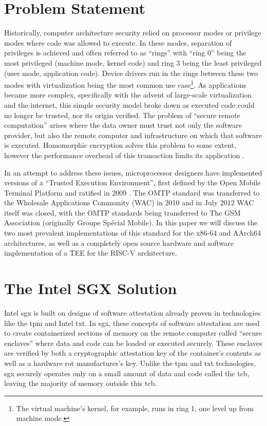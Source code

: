 \section{Problem Statement}
Historically, computer architecture security relied on processor modes or privilege modes where code was allowed to execute. In these modes, separation of privileges is achieved and often referred to as ``rings'' with ``ring 0'' being the most privileged (machine mode, kernel code) and ring 3 being the least privileged (user mode, application code). Device drivers run in the rings between these two modes with virtualization being the most common use case\footnote{The virtual machine’s kernel, for example, runs in ring 1, one level up from machine mode.}. As applications became more complex, specifically with the advent of large-scale virtualization and the internet, this simple security model broke down as executed code could no longer be trusted, nor its origin verified. The problem of ``secure remote computation'' arises where the data owner must trust not only the software provider, but also the remote computer and infrastructure on which that software is executed. Homomorphic encryption solves this problem to some extent, however the performance overhead of this transaction limits its application \cite{Gentry01}. 

In an attempt to address these issues, microprocessor designers have implemented versions of a ``Trusted Execution Environment'', first defined by the Open Mobile Terminal Platform and ratified in 2009 \cite{OMTP01}. The OMTP standard was transferred to the Wholesale Applications Community (WAC) in 2010 and in July 2012 WAC itself was closed, with the OMTP standards being transferred to The GSM Association (originally Groupe Spécial Mobile)\cite{WAC}. In this paper we will discuss the two most prevalent implementations of this standard for the x86-64 and AArch64 architectures, as well as a completely open source hardware and software implementation of a TEE for the RISC-V architecture.
\section{The Intel SGX Solution}
Intel \gls{sgx} is built on designs of software attestation already proven in technologies like the \gls{tpm} and Intel \gls{txt}. In \gls{sgx}, these concepts of software attestation are used to create containerized sections of memory on the remote computer called ``secure enclaves'' where data and code can be loaded or executed securely. These enclaves are verified by both a cryptographic attestation key of the container’s contents as well as a hardware \gls{rot} manufacturer’s key. Unlike the \gls{tpm} and \gls{txt} technologies, \gls{sgx} securely operates only on a small amount of data and code called the \gls{tcb}, leaving the majority of memory outside this \gls{tcb}.
